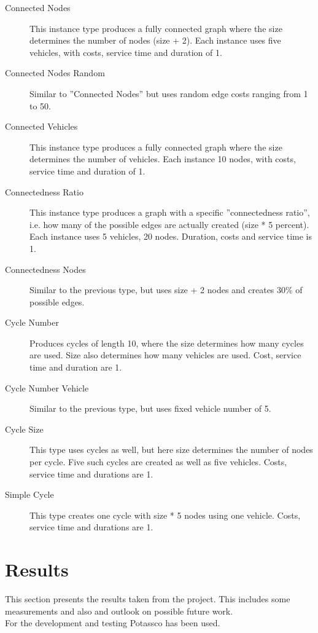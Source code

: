 \documentclass[12pt, letterpaper]{article}
\begin{document}
\begin{description}

\item[Connected Nodes]
This instance type produces a fully connected graph where the size determines the number of nodes (size + 2). Each instance uses five vehicles, with costs, service time and duration of 1.

\item[Connected Nodes Random]
Similar to ''Connected Nodes'' but uses random edge costs ranging from 1 to 50.

\item[Connected Vehicles]
This instance type produces a fully connected graph where the size determines the number of vehicles. Each instance 10 nodes, with costs, service time and duration of 1.

\item[Connectedness Ratio]
This instance type produces a graph with a specific ''connectedness ratio'', i.e. how many of the possible edges are actually created (size * 5 percent). Each instance uses 5 vehicles, 20 nodes. Duration, costs and service time is 1.

\item[Connectedness Nodes]
Similar to the previous type, but uses size + 2 nodes and creates 30\% of possible edges.

\item[Cycle Number]
Produces cycles of length 10, where the size determines how many cycles are used. Size also determines how many vehicles are used. Cost, service time and duration are 1.

\item[Cycle Number Vehicle]
Similar to the previous type, but uses fixed vehicle number of 5.

\item[Cycle Size]
This type uses cycles as well, but here size determines the number of nodes per cycle. Five such cycles are created as well as five vehicles. Costs, service time and durations are 1.

\item[Simple Cycle]
This type creates one cycle with size * 5 nodes using one vehicle. Costs, service time and durations are 1.

\end{description}


\section{Results}
This section presents the results taken from the project. This includes some measurements and also and outlook on possible future work.\\
For the development and testing Potassco \cite{potassco} has been used.
\end{document}
